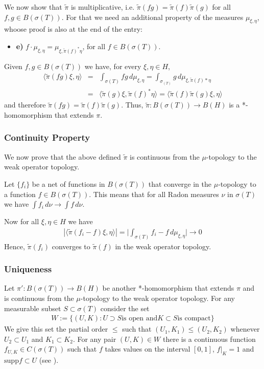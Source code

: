 \documentclass[12pt]{article}
\begin{document}
We now show that $\widetilde{\pi}$ is multiplicative, i.e. $\widetilde{\pi}(fg)=\widetilde{\pi}(f)\widetilde{\pi}(g)$ for all $f, g \in B(\sigma(T))$. For that we need an additional property of the measures $\mu_{\xi, \eta}$, whoose proof is also at the end of the entry:
\begin{itemize}
\item[] {\bf e)} $f\cdot \mu_{\xi, \eta} = \mu_{\xi, \widetilde{\pi}(f)^* \eta}$, for all $f \in B(\sigma(T))$.
\end{itemize}

Given $f, g \in B(\sigma(T))$ we have, for every $\xi, \eta \in H$,
\begin{eqnarray*}
\langle \widetilde{\pi}(fg) \xi, \eta \rangle & = & \int_{\sigma(T)} fg\, d\mu_{\xi, \eta} = \int_{\sigma_(T)} g\, d\mu_{\xi, \widetilde{\pi}(f)* \eta}\\
& = & \langle \widetilde{\pi}(g) \xi, \widetilde{\pi}(f)^* \eta \rangle = \langle \widetilde{\pi}(f) \widetilde{\pi}(g) \xi, \eta \rangle
\end{eqnarray*}
and therefore $\widetilde{\pi}(fg)= \widetilde{\pi}(f)\widetilde{\pi}(g)$. Thus, $\widetilde{\pi}: B(\sigma(T)) \to B(H)$ is a *-homomorphism that extends $\pi$.

\subsubsection{Continuity Property}
We now prove that the above defined $\widetilde{\pi}$ is continuous from the $\mu$-topology to the weak operator topology.

Let $\{f_i\}$ be a net of functions in $B(\sigma(T))$ that converge in the $\mu$-topology to a function $f \in B(\sigma(T))$. This means that for all Radon measures $\nu$ in $\sigma(T)$ we have $\int f_i \, d\nu \to \int f\, d\nu$.

Now for all $\xi, \eta \in H$ we have
\begin{align*}
|\langle \widetilde{\pi}(f_i - f) \xi, \eta \rangle| = \big| \int_{\sigma(T)} f_i-f \, d\mu_{\xi, \eta} \big| \to 0
\end{align*}
Hence, $\widetilde{\pi}(f_i)$ converges to $\widetilde{\pi}(f)$ in the weak operator topology.

\subsubsection{Uniqueness}

Let $\pi':B(\sigma(T)) \to B(H)$ be another *-homomorphism that extends $\pi$ and is continuous from the $\mu$-topology to the weak operator topology. For any measurable subset $S \subset \sigma(T)$ consider the set
\begin{align*}
W:=\{(U,K): U \supset S \text{is open and} K \subset S \text{is compact}\}
\end{align*}
We give this set the partial order $\leq$ such that $(U_1,K_1) \leq (U_2, K_2)$ whenever $U_2 \subset U_1$ and $K_1 \subset K_2$. For any pair $(U,K) \in W$ there is a continuous function $f_{U, K} \in C(\sigma(T))$ such that $f$ takes values on the interval $[0,1]$, $f|_K = 1$ and $\mathrm{supp} f \subset U$ (see ).
\end{document}
